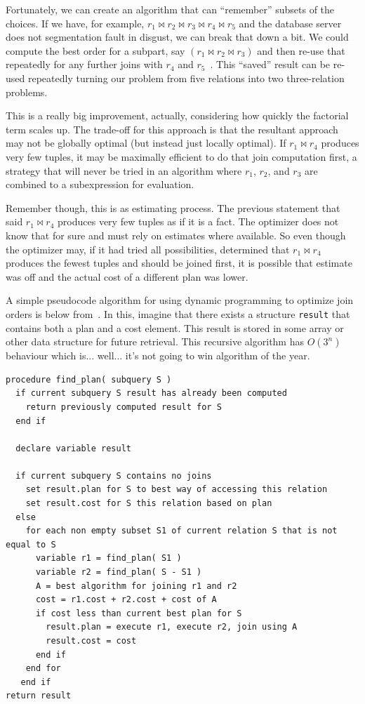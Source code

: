 \documentclass[a4paper]{report}
\begin{document}
Fortunately, we can create an algorithm that can ``remember'' subsets of the choices. If we have, for example, $r_{1} \bowtie r_{2} \bowtie r_{3} \bowtie r_{4} \bowtie r_{5}$ and the database server does not segmentation fault in disgust, we can break that down a bit. We could compute the best order for a subpart, say $(r_{1} \bowtie r_{2} \bowtie r_{3})$ and then re-use that repeatedly for any further joins with $r_{4}$ and $r_{5}$~\cite{dsc}. This ``saved'' result can be re-used repeatedly turning our problem from five relations into two three-relation problems.

This is a really big improvement, actually, considering how quickly the factorial term scales up. The trade-off for this approach is that the resultant approach may not be globally optimal (but instead just locally optimal). If $r_{1} \bowtie r_{4}$ produces very few tuples, it may be maximally efficient to do that join computation first, a strategy that will never be tried in an algorithm where $r_{1}$, $r_{2}$, and $r_{3}$ are combined to a subexpression for evaluation. 

Remember though, this is as estimating process. The previous statement that said $r_{1} \bowtie r_{4}$ produces very few tuples as if it is a fact. The optimizer does not know that for sure and must rely on estimates where available. So even though the optimizer may, if it had tried all possibilities, determined that $r_{1} \bowtie r_{4}$ produces the fewest tuples and should be joined first, it is possible that estimate was off and the actual cost of a different plan was lower.

A simple pseudocode algorithm for using dynamic programming to optimize join orders is below from~\cite{dsc}. In this, imagine that there exists a structure \texttt{result} that contains both a plan and a cost element. This result is stored in some array or other data structure for future retrieval. This recursive algorithm has $O(3^{n})$ behaviour which is... well... it's not going to win algorithm of the year.

\begin{verbatim}
procedure find_plan( subquery S ) 
  if current subquery S result has already been computed
    return previously computed result for S
  end if

  declare variable result

  if current subquery S contains no joins
    set result.plan for S to best way of accessing this relation
    set result.cost for S this relation based on plan
  else 
    for each non empty subset S1 of current relation S that is not equal to S
      variable r1 = find_plan( S1 ) 
      variable r2 = find_plan( S - S1 )
      A = best algorithm for joining r1 and r2
      cost = r1.cost + r2.cost + cost of A
      if cost less than current best plan for S
        result.plan = execute r1, execute r2, join using A
        result.cost = cost
      end if  
    end for
   end if
return result
\end{verbatim}
\end{document}
